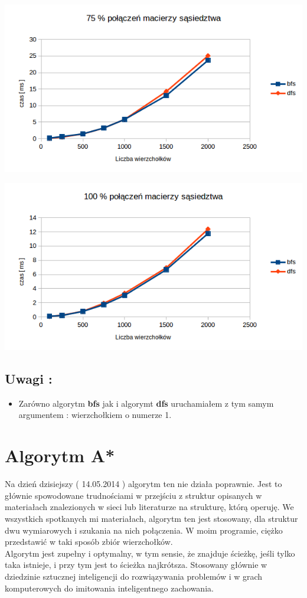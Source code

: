 \documentclass[10 pt]{article}
\begin{document}
\begin{center}
\includegraphics[scale=0.7]{75.png}
\end{center}
\begin{center}
\includegraphics[scale=0.7]{100.png}
\end{center}
\subsection{Uwagi :}
\begin{itemize}
\item Zarówno algorytm \textbf{bfs} jak i algorymt \textbf{dfs} uruchamiałem z tym samym argumentem : wierzchołkiem o numerze 1.
\end{itemize}
\section{Algorytm \textbf{A*}}
Na dzień dzisiejszy ( 14.05.2014 ) algorytm ten nie działa poprawnie. Jest to głównie spowodowane trudnościami w przejściu z struktur opisanych w materiałach znalezionych w sieci lub literaturze na strukturę, którą operuję. We wszystkich spotkanych mi materiałach, algorytm ten jest stosowany, dla struktur dwu wymiarowych i szukania na nich połączenia. W moim programie, ciężko przedstawić w taki sposób zbiór wierzchołków. 
\\
Algorytm jest zupełny i optymalny, w tym sensie, że znajduje ścieżkę, jeśli tylko taka istnieje, i przy tym jest to ścieżka najkrótsza. Stosowany głównie w dziedzinie sztucznej inteligencji do rozwiązywania problemów i w grach komputerowych do imitowania inteligentnego zachowania.
\end{document}
